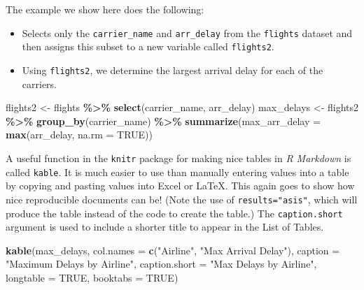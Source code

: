 \documentclass[12pt,twoside]{deuthesis}
\newenvironment{Shaded}{\begin{snugshade}}{\end{snugshade}}
\newcommand{\AttributeTok}[1]{\textcolor[rgb]{0.13,0.29,0.53}{#1}}
\newcommand{\ConstantTok}[1]{\textcolor[rgb]{0.56,0.35,0.01}{#1}}
\newcommand{\FunctionTok}[1]{\textcolor[rgb]{0.13,0.29,0.53}{\textbf{#1}}}
\newcommand{\NormalTok}[1]{#1}
\newcommand{\OtherTok}[1]{\textcolor[rgb]{0.56,0.35,0.01}{#1}}
\newcommand{\SpecialCharTok}[1]{\textcolor[rgb]{0.81,0.36,0.00}{\textbf{#1}}}
\newcommand{\StringTok}[1]{\textcolor[rgb]{0.31,0.60,0.02}{#1}}
\begin{document}
The example we show here does the following:
\begin{itemize}
\item
  Selects only the \texttt{carrier\_name} and \texttt{arr\_delay} from the \texttt{flights} dataset and then assigns this subset to a new variable called \texttt{flights2}.
\item
  Using \texttt{flights2}, we determine the largest arrival delay for each of the carriers.
\end{itemize}
\begin{Shaded}
\begin{Highlighting}[]
\NormalTok{flights2 }\OtherTok{\textless{}{-}}\NormalTok{ flights }\SpecialCharTok{\%\textgreater{}\%} 
  \FunctionTok{select}\NormalTok{(carrier\_name, arr\_delay)}
\NormalTok{max\_delays }\OtherTok{\textless{}{-}}\NormalTok{ flights2 }\SpecialCharTok{\%\textgreater{}\%} 
  \FunctionTok{group\_by}\NormalTok{(carrier\_name) }\SpecialCharTok{\%\textgreater{}\%}
  \FunctionTok{summarize}\NormalTok{(}\AttributeTok{max\_arr\_delay =} \FunctionTok{max}\NormalTok{(arr\_delay, }\AttributeTok{na.rm =} \ConstantTok{TRUE}\NormalTok{))}
\end{Highlighting}
\end{Shaded}
A useful function in the \texttt{knitr} package for making nice tables in \emph{R Markdown} is called \texttt{kable}. It is much easier to use than manually entering values into a table by copying and pasting values into Excel or LaTeX. This again goes to show how nice reproducible documents can be! (Note the use of \texttt{results="asis"}, which will produce the table instead of the code to create the table.) The \texttt{caption.short} argument is used to include a shorter title to appear in the List of Tables.
\begin{Shaded}
\begin{Highlighting}[]
\FunctionTok{kable}\NormalTok{(max\_delays, }
      \AttributeTok{col.names =} \FunctionTok{c}\NormalTok{(}\StringTok{"Airline"}\NormalTok{, }\StringTok{"Max Arrival Delay"}\NormalTok{),}
      \AttributeTok{caption =} \StringTok{"Maximum Delays by Airline"}\NormalTok{,}
      \AttributeTok{caption.short =} \StringTok{"Max Delays by Airline"}\NormalTok{,}
      \AttributeTok{longtable =} \ConstantTok{TRUE}\NormalTok{,}
      \AttributeTok{booktabs =} \ConstantTok{TRUE}\NormalTok{)}
\end{Highlighting}
\end{Shaded}
\end{document}
